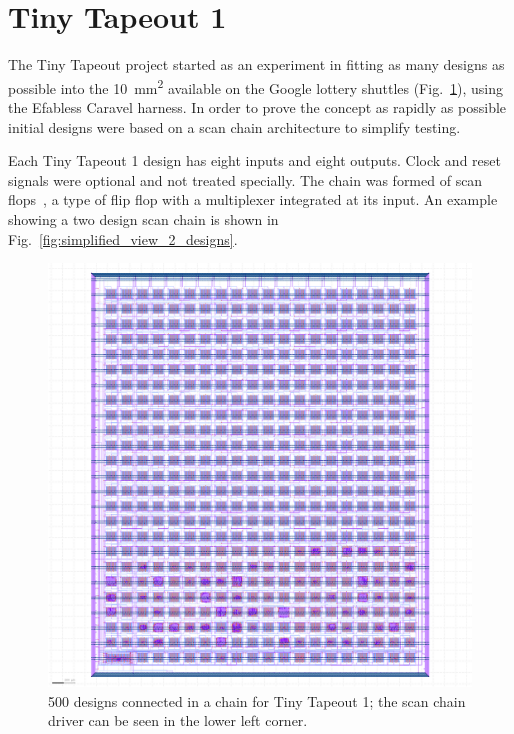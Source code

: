 \section{Tiny Tapeout 1}
\label{sec:tinytapeout1}

The Tiny Tapeout project started as an experiment in fitting as many designs as possible into the \qty{10}{\milli\meter\squared} available on the Google lottery shuttles (Fig.~\ref{fig:500_designs_chain_TT01}), using the Efabless Caravel harness.
In order to prove the concept as rapidly as possible initial designs were based on a scan chain architecture to simplify testing.

Each Tiny Tapeout 1 design has eight inputs and eight outputs.
Clock and reset signals were optional and not treated specially. The chain was formed of scan flops~\cite{skywaterpdk}, a type of flip flop with a multiplexer integrated at its input. An example showing a two design scan chain is shown in Fig.~\ref{fig:simplified_view_2_designs}.

\begin{figure}[!t]
\centering
\includegraphics[width=1\columnwidth]{./Figs/tt01_whole_die.png}
\caption{500 designs connected in a chain for Tiny Tapeout 1; the scan chain driver can be seen in the lower left corner.}
\label{fig:500_designs_chain_TT01}
\end{figure}

